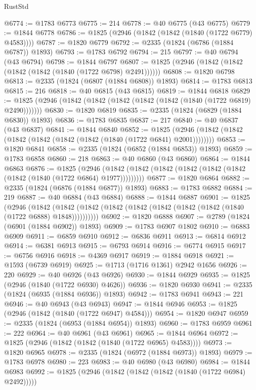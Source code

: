 \begin{lexlean}{RustStd}
\begin{coremodule}
@6774 := @1783 @6773
@6775 := 214
@6778 := @40 @6775 (@43 @6775)
@6779 := @1844 @6778
@6786 := @1825 (@2946 (@1842 (@1842 (@1840 (@1722 @6779) @4583))))
@6787 := @1820 @6779
@6792 := @2335 (@1824 (@6786 (@1884 @6787)) @1893)
@6793 := @1783 @6792
@6794 := 215
@6797 := @40 @6794 (@43 @6794)
@6798 := @1844 @6797
@6807 := @1825 (@2946 (@1842 (@1842 (@1842 (@1842 (@1840 (@1722 @6798) @2491))))))
@6808 := @1820 @6798
@6813 := @2335 (@1824 (@6807 (@1884 @6808)) @1893)
@6814 := @1783 @6813
@6815 := 216
@6818 := @40 @6815 (@43 @6815)
@6819 := @1844 @6818
@6829 := @1825 (@2946 (@1842 (@1842 (@1842 (@1842 (@1842 (@1840 (@1722 @6819) @2490)))))))
@6830 := @1820 @6819
@6835 := @2335 (@1824 (@6829 (@1884 @6830)) @1893)
@6836 := @1783 @6835
@6837 := 217
@6840 := @40 @6837 (@43 @6837)
@6841 := @1844 @6840
@6852 := @1825 (@2946 (@1842 (@1842 (@1842 (@1842 (@1842 (@1842 (@1840 (@1722 @6841) @2001))))))))
@6853 := @1820 @6841
@6858 := @2335 (@1824 (@6852 (@1884 @6853)) @1893)
@6859 := @1783 @6858
@6860 := 218
@6863 := @40 @6860 (@43 @6860)
@6864 := @1844 @6863
@6876 := @1825
    (@2946 (@1842 (@1842 (@1842 (@1842 (@1842 (@1842 (@1842 (@1840 (@1722 @6864) @1977)))))))))
@6877 := @1820 @6864
@6882 := @2335 (@1824 (@6876 (@1884 @6877)) @1893)
@6883 := @1783 @6882
@6884 := 219
@6887 := @40 @6884 (@43 @6884)
@6888 := @1844 @6887
@6901 := @1825
    (@2946
      (@1842 (@1842 (@1842 (@1842 (@1842 (@1842 (@1842 (@1842 (@1840 (@1722 @6888) @1848))))))))))
@6902 := @1820 @6888
@6907 := @2789 (@1824 (@6901 (@1884 @6902)) @1893)
@6909 := @1783 @6907 @1802
@6910 := @6883 @6909
@6911 := @6859 @6910
@6912 := @6836 @6911
@6913 := @6814 @6912
@6914 := @6381 @6913
@6915 := @6793 @6914
@6916 := @6774 @6915
@6917 := @6756 @6916
@6918 := @4369 @6917
@6919 := @1884 @6918
@6921 := @1593 (@6739 @6919)
@6925 := @1713 (@1716 @1361) @2942 @1656
@6926 := 220
@6929 := @40 @6926 (@43 @6926)
@6930 := @1844 @6929
@6935 := @1825 (@2946 (@1840 (@1722 @6930) @4626))
@6936 := @1820 @6930
@6941 := @2335 (@1824 (@6935 (@1884 @6936)) @1893)
@6942 := @1783 @6941
@6943 := 221
@6946 := @40 @6943 (@43 @6943)
@6947 := @1844 @6946
@6953 := @1825 (@2946 (@1842 (@1840 (@1722 @6947) @4584)))
@6954 := @1820 @6947
@6959 := @2335 (@1824 (@6953 (@1884 @6954)) @1893)
@6960 := @1783 @6959
@6961 := 222
@6964 := @40 @6961 (@43 @6961)
@6965 := @1844 @6964
@6972 := @1825 (@2946 (@1842 (@1842 (@1840 (@1722 @6965) @4583))))
@6973 := @1820 @6965
@6978 := @2335 (@1824 (@6972 (@1884 @6973)) @1893)
@6979 := @1783 @6978
@6980 := 223
@6983 := @40 @6980 (@43 @6980)
@6984 := @1844 @6983
@6992 := @1825 (@2946 (@1842 (@1842 (@1842 (@1840 (@1722 @6984) @2492)))))

\end{coremodule}
\end{lexlean}

